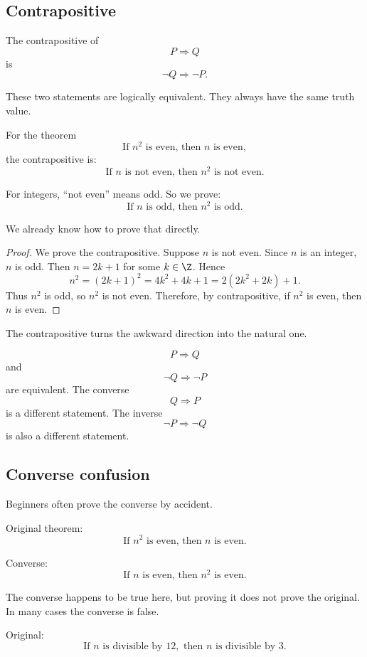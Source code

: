 \subsection{Contrapositive}

The contrapositive of
\[
P\Rightarrow Q
\]
is
\[
\neg Q\Rightarrow\neg P.
\]

These two statements are logically equivalent. They always have the same truth value.

For the theorem
\[
\text{If }n^2\text{ is even, then }n\text{ is even},
\]
the contrapositive is:
\[
\text{If }n\text{ is not even, then }n^2\text{ is not even}.
\]

For integers, ``not even'' means odd. So we prove:
\[
\text{If }n\text{ is odd, then }n^2\text{ is odd}.
\]

We already know how to prove that directly.

\begin{proof}
We prove the contrapositive. Suppose $n$ is not even. Since $n$ is an integer, $n$ is odd. Then $n=2k+1$ for some $k\in\Z$. Hence
\[
n^2=(2k+1)^2=4k^2+4k+1=2(2k^2+2k)+1.
\]
Thus $n^2$ is odd, so $n^2$ is not even. Therefore, by contrapositive, if $n^2$ is even, then $n$ is even.
\end{proof}

The contrapositive turns the awkward direction into the natural one.

\begin{formalbox}
\[
P\Rightarrow Q
\]
and
\[
\neg Q\Rightarrow\neg P
\]
are equivalent. The converse
\[
Q\Rightarrow P
\]
is a different statement. The inverse
\[
\neg P\Rightarrow\neg Q
\]
is also a different statement.
\end{formalbox}

\subsection{Converse confusion}

Beginners often prove the converse by accident.

Original theorem:
\[
\text{If }n^2\text{ is even, then }n\text{ is even}.
\]

Converse:
\[
\text{If }n\text{ is even, then }n^2\text{ is even}.
\]

The converse happens to be true here, but proving it does not prove the original. In many cases the converse is false.

Original:
\[
\text{If }n\text{ is divisible by }12,\text{ then }n\text{ is divisible by }3.
\]

